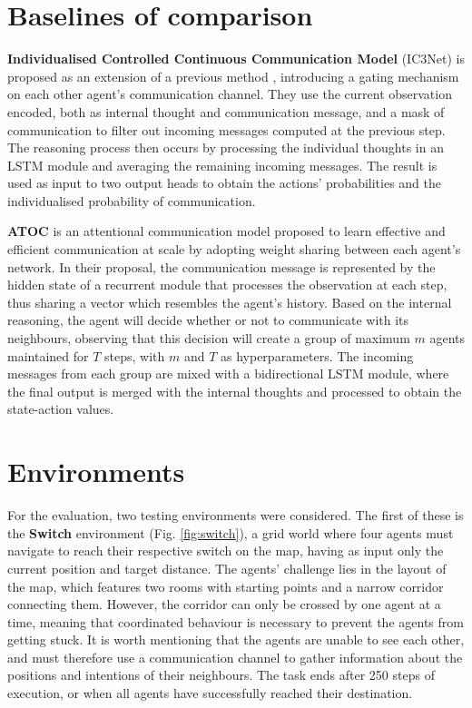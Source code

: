 \documentclass[a4paper,singleside,12pt]{report} %
\begin{document}
\section{Baselines of comparison}\label{Baselines}
\textbf{Individualised Controlled Continuous Communication Model} (IC3Net)\cite{IC3NETSingh2018LearningWT} is proposed as an extension of a previous method \cite{Sukhbaatar2016LearningMC}, introducing a gating mechanism on each other agent's communication channel. They use the current observation encoded, both as internal thought and communication message, and a mask of communication to filter out incoming messages computed at the previous step. The reasoning process then occurs by processing the individual thoughts in an LSTM module and averaging the remaining incoming messages. The result is used as input to two output heads to obtain the actions' probabilities and the individualised probability of communication.

\textbf{ATOC} \cite{ATOCJiang2018LearningAC} is an attentional communication model proposed to learn effective and efficient communication at scale by adopting weight sharing between each agent's network. In their proposal, the communication message is represented by the hidden state of a recurrent module that processes the observation at each step, thus sharing a vector which resembles the agent's history. Based on the internal reasoning, the agent will decide whether or not to communicate with its neighbours, observing that this decision will create a group of maximum $m$ agents maintained for $T$ steps, with $m$ and $T$ as hyperparameters. The incoming messages from each group are mixed with a bidirectional LSTM module, where the final output is merged with the internal thoughts and processed to obtain the state-action values.
 
\section{Environments}\label{Environments}

For the evaluation, two testing environments were considered. The first of these is the \textbf{Switch} environment \cite{magym} (Fig. \ref{fig:switch}), a grid world where four agents must navigate to reach their respective switch on the map, having as input only the current position and target distance. The agents' challenge lies in the layout of the map, which features two rooms with starting points and a narrow corridor connecting them. However, the corridor can only be crossed by one agent at a time, meaning that coordinated behaviour is necessary to prevent the agents from getting stuck. It is worth mentioning that the agents are unable to see each other, and must therefore use a communication channel to gather information about the positions and intentions of their neighbours. The task ends after 250 steps of execution, or when all agents have successfully reached their destination. 
\end{document}
